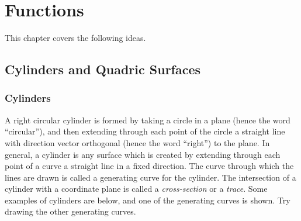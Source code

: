 
\chapter{Functions}

This chapter covers the following ideas. 




\section{Cylinders and Quadric Surfaces}

\subsection{Cylinders}
A right circular cylinder is formed by taking a circle in a plane
(hence the word ``circular''), and then extending through each point
of the circle a straight line with direction vector orthogonal (hence
the word ``right'') to the plane.  In general, a cylinder is any
surface which is created by extending through each point of a curve a
straight line in a fixed direction.  The curve through which the lines
are drawn is called a generating curve for the cylinder. The
intersection of a cylinder with a coordinate plane is called a
\emph{cross-section} or a \emph{trace}. Some examples of cylinders are
below, and one of the generating curves is shown.  Try drawing the
other generating curves.
\renewcommand{\mywidth}{1.0in}
